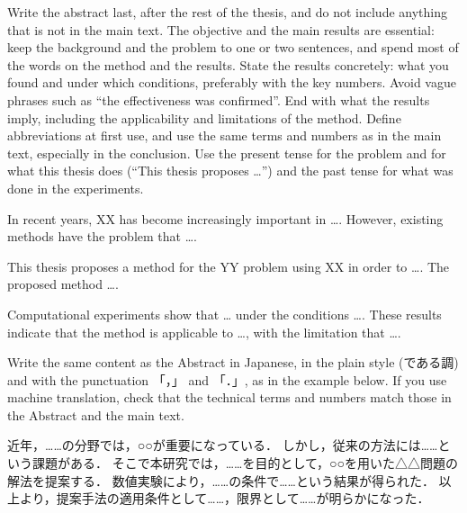 \begin{abstractEN}
\begin{writingnote}
Write the abstract last, after the rest of the thesis, and do not include anything that is not in the main text.
The objective and the main results are essential: keep the background and the problem to one or two sentences,
and spend most of the words on the method and the results.
State the results concretely: what you found and under which conditions, preferably with the key numbers.
Avoid vague phrases such as ``the effectiveness was confirmed''.
End with what the results imply, including the applicability and limitations of the method.
Define abbreviations at first use, and use the same terms and numbers as in the main text, especially in the conclusion.
Use the present tense for the problem and for what this thesis does (``This thesis proposes \ldots'')
and the past tense for what was done in the experiments.
\end{writingnote}

In recent years, XX has become increasingly important in \ldots.
However, existing methods have the problem that \ldots.

This thesis proposes a method for the YY problem using XX in order to \ldots.
The proposed method \ldots.

Computational experiments show that \ldots{} under the conditions \ldots.
These results indicate that the method is applicable to \ldots, with the limitation that \ldots.
\end{abstractEN}

\begin{abstractJA}
\begin{writingnote}
Write the same content as the Abstract in Japanese, in the plain style (である調) and with the punctuation 「，」 and 「．」, as in the example below.
If you use machine translation, check that the technical terms and numbers match those in the Abstract and the main text.
\end{writingnote}

近年，……の分野では，○○が重要になっている．
しかし，従来の方法には……という課題がある．
そこで本研究では，……を目的として，○○を用いた△△問題の解法を提案する．
数値実験により，……の条件で……という結果が得られた．
以上より，提案手法の適用条件として……，限界として……が明らかになった．
\end{abstractJA}
